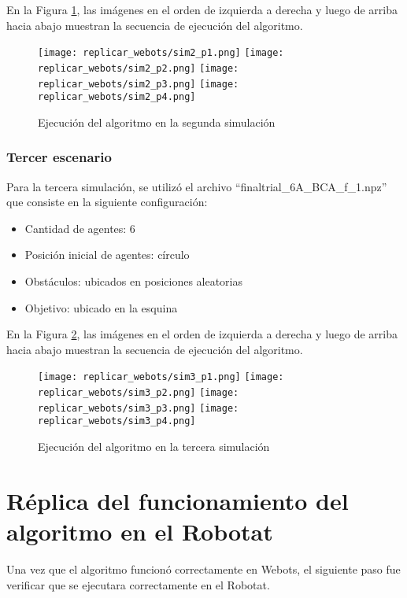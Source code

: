 En la Figura \ref{fig:segunda_simulacion}, las imágenes en el orden de izquierda a derecha y luego de arriba hacia abajo muestran la secuencia de ejecución del algoritmo.

\begin{figure}[H]
	\centering
	\texttt{[image: replicar\_webots/sim2\_p1.png]}
	\texttt{[image: replicar\_webots/sim2\_p2.png]}
	\texttt{[image: replicar\_webots/sim2\_p3.png]}
	\texttt{[image: replicar\_webots/sim2\_p4.png]}
	\caption{Ejecución del algoritmo en la segunda simulación}
	\label{fig:segunda_simulacion}
\end{figure}

\subsubsection{Tercer escenario}
Para la tercera simulación, se utilizó el archivo ``finaltrial\_6A\_BCA\_f\_1.npz'' que consiste en la siguiente configuración:

\begin{itemize}
	\item Cantidad de agentes: 6
	\item Posición inicial de agentes: círculo
	\item Obstáculos: ubicados en posiciones aleatorias
	\item Objetivo: ubicado en la esquina
\end{itemize}

En la Figura \ref{fig:tercera_simulacion}, las imágenes en el orden de izquierda a derecha y luego de arriba hacia abajo muestran la secuencia de ejecución del algoritmo.

\begin{figure}[H]
	\centering
	\texttt{[image: replicar\_webots/sim3\_p1.png]}
	\texttt{[image: replicar\_webots/sim3\_p2.png]}
	\texttt{[image: replicar\_webots/sim3\_p3.png]}
	\texttt{[image: replicar\_webots/sim3\_p4.png]}
	\caption{Ejecución del algoritmo en la tercera simulación}
	\label{fig:tercera_simulacion}
\end{figure}

\section{Réplica del funcionamiento del algoritmo en el Robotat}
Una vez que el algoritmo funcionó correctamente en Webots, el siguiente paso fue verificar que se ejecutara correctamente en el Robotat.

